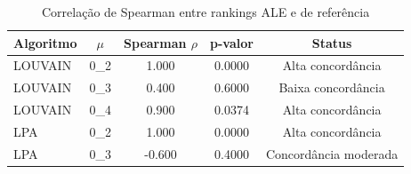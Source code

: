 \begin{table}[H]
\centering
\caption{Correlação de Spearman entre rankings ALE e de referência}
\label{tab:spearman_ale_ranking}
\begin{tabular}{lcccc}
\hline
\textbf{Algoritmo} & \textbf{$\mu$} & \textbf{Spearman $\rho$} & \textbf{p-valor} & \textbf{Status} \\
\hline
LOUVAIN & 0_2 & 1.000 & 0.0000 & Alta concordância \\
LOUVAIN & 0_3 & 0.400 & 0.6000 & Baixa concordância \\
LOUVAIN & 0_4 & 0.900 & 0.0374 & Alta concordância \\
LPA & 0_2 & 1.000 & 0.0000 & Alta concordância \\
LPA & 0_3 & -0.600 & 0.4000 & Concordância moderada \\
\hline
\end{tabular}
\end{table}
